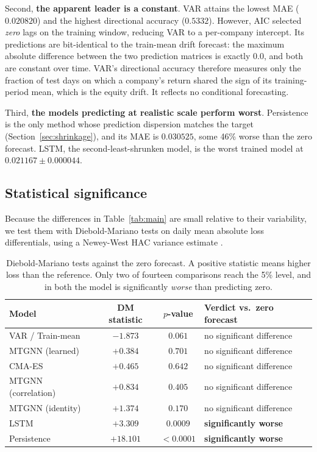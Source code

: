 Second, \textbf{the apparent leader is a constant}. VAR attains the lowest MAE ($0.020820$) and the highest directional accuracy ($0.5332$). However, AIC selected \emph{zero} lags on the training window, reducing VAR to a per-company intercept. Its predictions are bit-identical to the train-mean drift forecast: the maximum absolute difference between the two prediction matrices is exactly $0.0$, and both are constant over time. VAR's directional accuracy therefore measures only the fraction of test days on which a company's return shared the sign of its training-period mean, which is the equity drift. It reflects no conditional forecasting.

Third, \textbf{the models predicting at realistic scale perform worst}. Persistence is the only method whose prediction dispersion matches the target (Section~\ref{sec:shrinkage}), and its MAE is $0.030525$, some 46\% worse than the zero forecast. LSTM, the second-least-shrunken model, is the worst trained model at $0.021167 \pm 0.000044$.

\subsection{Statistical significance}

Because the differences in Table~\ref{tab:main} are small relative to their variability, we test them with Diebold-Mariano tests on daily mean absolute loss differentials, using a Newey-West HAC variance estimate \parencite{diebold1995comparing}.

\begin{table}[H]
\centering
\begin{tabular}{lccl}
\toprule
Model & DM statistic & $p$-value & Verdict vs.\ zero forecast \\
\midrule
VAR / Train-mean      & $-1.873$  & $0.061$   & no significant difference \\
MTGNN (learned)       & $+0.384$  & $0.701$   & no significant difference \\
CMA-ES                & $+0.465$  & $0.642$   & no significant difference \\
MTGNN (correlation)   & $+0.834$  & $0.405$   & no significant difference \\
MTGNN (identity)      & $+1.374$  & $0.170$   & no significant difference \\
LSTM                  & $+3.309$  & $0.0009$  & \textbf{significantly worse} \\
Persistence           & $+18.101$ & $<0.0001$ & \textbf{significantly worse} \\
\bottomrule
\end{tabular}
\caption{Diebold-Mariano tests against the zero forecast. A positive statistic means higher loss than the reference. Only two of fourteen comparisons reach the 5\% level, and in both the model is significantly \emph{worse} than predicting zero.}
\label{tab:dm}
\end{table}

